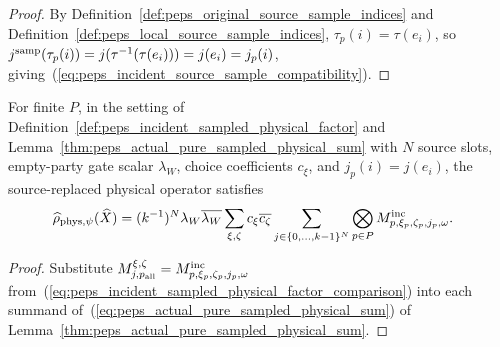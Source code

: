 \begin{proof}
    \leanok
    By Definition~\ref{def:peps_original_source_sample_indices} and
    Definition~\ref{def:peps_local_source_sample_indices}, $\tau_p(i)=\tau(e_i)$,
    so $j^{\rm samp}(\tau_p(i))=j(\tau^{-1}(\tau(e_i)))=j(e_i)=j_p(i)$,
    giving~(\ref{eq:peps_incident_source_sample_compatibility}).
\end{proof}

\begin{lemma}
    \label{thm:peps_incident_pure_sampled_physical_sum}
    \leanok
    For finite $P$, in the setting of
    Definition~\ref{def:peps_incident_sampled_physical_factor} and
    Lemma~\ref{thm:peps_actual_pure_sampled_physical_sum} with $N$ source
    slots, empty-party gate scalar $\lambda_W$, choice coefficients $c_\xi$,
    and $j_p(i)=j(e_i)$, the source-replaced physical operator satisfies
    \begin{align}
        \widehat\rho_{\mathrm{phys},\psi}(\widehat X)
         & =(k^{-1})^N\lambda_W\overline{\lambda_W}
        \sum_{\xi,\zeta}c_\xi\overline{c_\zeta}
        \sum_{j\in\{0,\ldots,k-1\}^N}
        \bigotimes_{p\in P}
        M^{\rm inc}_{p,\xi_p,\zeta_p,j_p,\omega}.
        \label{eq:peps_incident_pure_sampled_physical_sum}
    \end{align}
\end{lemma}

\begin{proof}
    \leanok
    Substitute $M^{\xi,\zeta}_{j,p_{\rm all}}=M^{\rm inc}_{p,\xi_p,\zeta_p,j_p,\omega}$
    from~(\ref{eq:peps_incident_sampled_physical_factor_comparison}) into each
    summand of~(\ref{eq:peps_actual_pure_sampled_physical_sum}) of
    Lemma~\ref{thm:peps_actual_pure_sampled_physical_sum}.
\end{proof}

